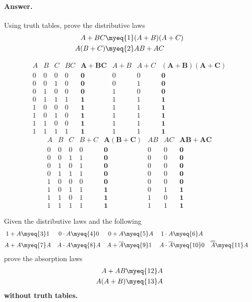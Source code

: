 \paragraph{Answer.} 
Using truth tables, prove the distributive laws
\begin{align*}
A + BC  &\myeq{1} (A + B)(A + C)\\
A (B+C) &\myeq{2} AB + AC
\end{align*}

\[
\begin{array}{c|c|c||c|c|c|c|c}
  A & B & C & BC & \mathbf{A+BC} & A+B & A+C & \mathbf{(A+B)(A+C)}\\
\hline
  0 & 0 & 0 &  0 &    \mathbf{0} &   0 &   0 & \mathbf{0}\\
  0 & 0 & 1 &  0 &    \mathbf{0} &   0 &   1 & \mathbf{0}\\
  0 & 1 & 0 &  0 &    \mathbf{0} &   1 &   0 & \mathbf{0}\\
  0 & 1 & 1 &  1 &    \mathbf{1} &   1 &   1 & \mathbf{1}\\
  1 & 0 & 0 &  0 &    \mathbf{1} &   1 &   1 & \mathbf{1}\\
  1 & 0 & 1 &  0 &    \mathbf{1} &   1 &   1 & \mathbf{1}\\
  1 & 1 & 0 &  0 &    \mathbf{1} &   1 &   1 & \mathbf{1}\\
  1 & 1 & 1 &  1 &    \mathbf{1} &   1 &   1 & \mathbf{1}
\end{array}
\]
\[
\begin{array}{c|c|c||c|c|c|c|c}
  A & B & C & B+C & \mathbf{A(B+C)} & AB & AC & \mathbf{AB+AC}\\
\hline
  0 & 0 & 0 &   0 &      \mathbf{0} &  0 &  0 & \mathbf{0}\\
  0 & 0 & 1 &   1 &      \mathbf{0} &  0 &  0 & \mathbf{0}\\
  0 & 1 & 0 &   1 &      \mathbf{0} &  0 &  0 & \mathbf{0}\\
  0 & 1 & 1 &   1 &      \mathbf{0} &  0 &  0 & \mathbf{0}\\
  1 & 0 & 0 &   0 &      \mathbf{0} &  0 &  0 & \mathbf{0}\\
  1 & 0 & 1 &   1 &      \mathbf{1} &  0 &  1 & \mathbf{1}\\
  1 & 1 & 0 &   1 &      \mathbf{1} &  1 &  0 & \mathbf{1}\\
  1 & 1 & 1 &   1 &      \mathbf{1} &  1 &  1 & \mathbf{1}
\end{array}
\]


\noindent Given the distributive laws and the following
\begin{align*}
1 + A &\myeq{3} 1 & 0 \cdot A &\myeq{4} 0 & 0 + A &\myeq{5} A & 1
\cdot A &\myeq{6} A\\
A + A &\myeq{7} A & A \cdot A &\myeq{8} A & A + \overline{A} &\myeq{9}
1 & A \cdot \overline{A} &\myeq{10} 0 & \overline{\overline{A}}
&\myeq{11} A
\end{align*}
\noindent prove the absorption laws
\begin{align*}
A + AB &\myeq{12} A\\
A (A+B) &\myeq{13} A
\end{align*}
\textbf{without truth tables.}
